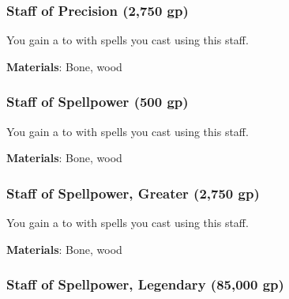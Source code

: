 \lowercase{\hypertarget{item:Staff of Precision}{}}\label{item:Staff of Precision}
\hypertarget{item:Staff of Precision}{\subsubsection{Staff of Precision\hfill{} (2,750 gp)}}

You gain a   to  with spells you cast using this staff.



\vspace{0.25em}
\textbf{Materials}: Bone, wood


\lowercase{\hypertarget{item:Staff of Spellpower}{}}\label{item:Staff of Spellpower}
\hypertarget{item:Staff of Spellpower}{\subsubsection{Staff of Spellpower\hfill{} (500 gp)}}

You gain a   to  with spells you cast using this staff.



\vspace{0.25em}
\textbf{Materials}: Bone, wood


\lowercase{\hypertarget{item:Staff of Spellpower, Greater}{}}\label{item:Staff of Spellpower, Greater}
\hypertarget{item:Staff of Spellpower, Greater}{\subsubsection{Staff of Spellpower, Greater\hfill{} (2,750 gp)}}

You gain a   to  with spells you cast using this staff.



\vspace{0.25em}
\textbf{Materials}: Bone, wood


\lowercase{\hypertarget{item:Staff of Spellpower, Legendary}{}}\label{item:Staff of Spellpower, Legendary}
\hypertarget{item:Staff of Spellpower, Legendary}{\subsubsection{Staff of Spellpower, Legendary\hfill{} (85,000 gp)}}


